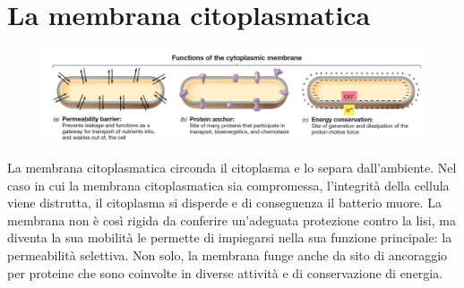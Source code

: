 \section{La membrana citoplasmatica}
\begin{figure}[H]
	\includegraphics[width=\textwidth]{Pictures/8.png}
\end{figure}
La membrana citoplasmatica circonda il citoplasma e lo separa dall’ambiente. Nel caso in cui la membrana citoplasmatica sia compromessa, l’integrità della 
cellula viene distrutta, il citoplasma si disperde e di conseguenza il batterio muore. La membrana non è così rigida da conferire un’adeguata protezione 
contro la lisi, ma diventa la sua mobilità le permette di impiegarsi nella sua funzione principale: la permeabilità selettiva. Non solo, la membrana funge 
anche da sito di ancoraggio per proteine che sono coinvolte in diverse attività e di conservazione di energia.
